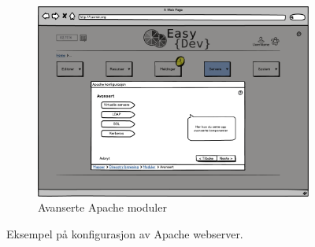 \begin{figure}[p]
        \vspace{0.6cm}
        \begin{subfigure}[b]{0.48\textwidth}
                \includegraphics[width=\textwidth]
                {./img/prosessdokumentasjon/lowfi/apache5.png}
                \caption{Avanserte Apache moduler}
                \label{fig:apache5}
        \end{subfigure}
        
        \vspace{0.6cm}
        \caption[Konfigurasjon av Apache webserver]{Eksempel på konfigurasjon av Apache webserver.}\label{fig:lowfiapache}
\end{figure}



